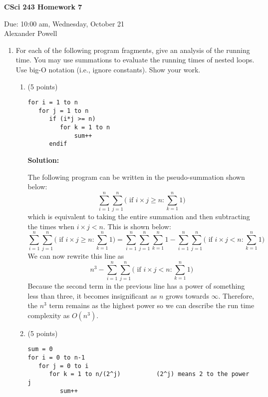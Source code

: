 \documentclass[11pt]{article}
\begin{document}
\begin{center}             %
\begin{LARGE}
{\bf CSci 243 Homework 7}
\end{LARGE}
\vskip 0.25cm      %

Due: 10:00 am, Wednesday, October 21 \\  %
Alexander Powell
\end{center}

\begin{enumerate}

\item For each of the following program fragments, give an analysis of 
the running time. You may use summations to evaluate the running times 
of nested loops. Use big-O notation (i.e., ignore constants). Show your work.

\begin{enumerate}

\item (5 points)
\begin{verbatim}
for i = 1 to n
   for j = 1 to n
      if (i*j >= n)
         for k = 1 to n
             sum++
      endif
\end{verbatim}

\textbf{Solution: }

The following program can be written in the pseudo-summation shown below:
$$ \sum_{i=1}^{n} \sum_{j=1}^{n} \bigg( \text{ if } i \times j \geq n: \sum_{k=1}^{n} 1 \bigg) $$
which is equivalent to taking the entire summation and then subtracting the times when $i \times j < n$.  This is shown below:
$$ \sum_{i=1}^{n} \sum_{j=1}^{n} \bigg( \text{ if } i \times j \geq n: \sum_{k=1}^{n} 1 \bigg) = \sum_{i=1}^{n} \sum_{j=1}^{n} \sum_{k=1}^{n} 1 - \sum_{i=1}^{n} \sum_{j=1}^{n} \bigg( \text{ if } i \times j < n: \sum_{k=1}^{n} 1 \bigg) $$
We can now rewrite this line as 
$$ n^3 - \sum_{i=1}^{n} \sum_{j=1}^{n} \bigg( \text{ if } i \times j < n: \sum_{k=1}^{n} 1 \bigg) $$
Because the second term in the previous line has a power of something less than three, it becomes insignificant as $n$ grows towards $\infty$.  Therefore, the $n^3$ term remains as the highest power so we can describe the run time complexity as $O(n^3)$.  

\newpage

\item (5 points)
\begin{verbatim}
sum = 0
for i = 0 to n-1
   for j = 0 to i 
      for k = 1 to n/(2^j)          (2^j) means 2 to the power j
         sum++
\end{verbatim}


\end{enumerate}
\end{enumerate}
\end{document}
